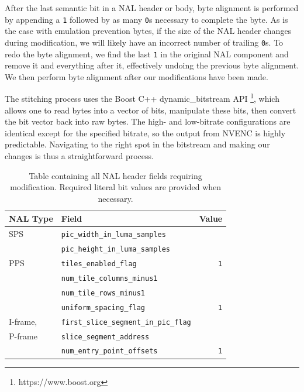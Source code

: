 After the last semantic bit in a NAL header or body, byte alignment is performed by appending a \texttt{1} followed by as many \texttt{0}s necessary to complete the byte. As is the case with emulation prevention bytes, if the size of the NAL header changes during modification, we will likely have an incorrect number of trailing \texttt{0}s. To redo the byte alignment, we find the last \texttt{1} in the original NAL component and remove it and everything after it, effectively undoing the previous byte alignment. We then perform byte alignment after our modifications have been made.

The stitching process uses the Boost C++ dynamic\_bitstream API \footnote{https://www.boost.org}, which allows one to read bytes into a vector of bits, manipulate these bits, then convert the bit vector back into raw bytes. The high- and low-bitrate configurations are identical except for the specified bitrate, so the output from NVENC is highly predictable. Navigating to the right spot in the bitstream and making our changes is thus a straightforward process.

\setcounter{figure}{1}
\begin{table}
	\label{tab:stitch}
	\begin{tabularx}{\columnwidth}{llr}
		\toprule
		NAL Type & Field & Value \\
		\midrule
		SPS & \texttt{pic\_width\_in\_luma\_samples} & \\
		 & \texttt{pic\_height\_in\_luma\_samples} &  \\
		\midrule
		PPS & \texttt{tiles\_enabled\_flag} & \texttt{1}  \\
		& \texttt{num\_tile\_columns\_minus1} &  \\ 
		& \texttt{num\_tile\_rows\_minus1} &  \\
		& \texttt{uniform\_spacing\_flag} & \texttt{1}  \\
		\midrule
		I-frame, & \texttt{first\_slice\_segment\_in\_pic\_flag} & \\
		P-frame & \texttt{slice\_segment\_address} &  \\
		& \texttt{num\_entry\_point\_offsets} & \texttt{1}  \\
		\bottomrule
	\end{tabularx}
	\caption{Table containing all NAL header fields requiring modification. Required literal bit values are provided when necessary.}
\end{table}
\renewcommand{\figurename}{Fig.}
\setcounter{figure}{1}

